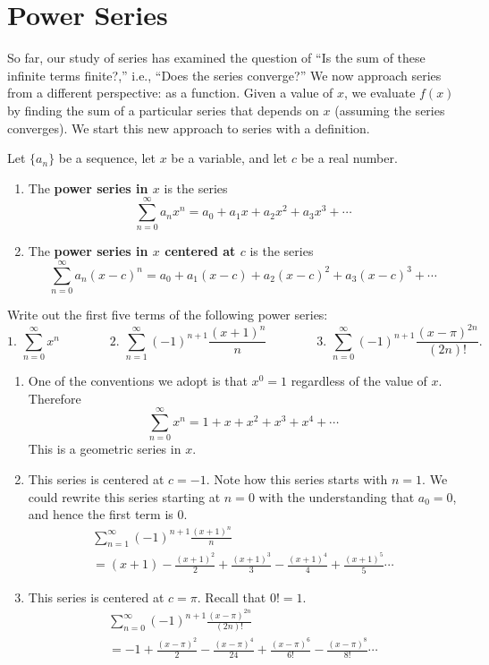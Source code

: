 \section{Power Series}\label{sec:power_series}

So far, our study of series has examined the question of ``Is the sum of these infinite terms finite?,'' i.e., ``Does the series converge?'' We now approach series from a different perspective: as a function. Given a value of $x$, we evaluate $f(x)$ by finding the sum of a particular series that depends on $x$ (assuming the series converges). We start this new approach to series with a definition.

\begin{definition}\label{def:power_series}
Let $\{a_n\}$ be a sequence, let $x$ be a variable, and let $c$ be a real number.
	\begin{enumerate}
		\item The \textbf{power series in $x$} is the series
		\[\sum_{n=0}^\infty a_nx^n = a_0+a_1x+a_2x^2+a_3x^3+\dotsb\]
		
		\item The \textbf{power series in $x$ centered at $c$} is the series
		\[\sum_{n=0}^\infty a_n(x-c)^n = a_0+a_1(x-c)+a_2(x-c)^2+a_3(x-c)^3+\dotsb\]
	\end{enumerate}
\end{definition}

\begin{example}\label{ex_ps1}
Write out the first five terms of the following power series:
\[
 \text{1. }\sum_{n=0}^\infty x^n \qquad\qquad
 \text{2. }\sum_{n=1}^\infty (-1)^{n+1}\frac{(x+1)^n}n\qquad\qquad
 \text{3. }\sum_{n=0}^\infty (-1)^{n+1} \frac{(x-\pi)^{2n}}{(2n)!}.
\]
\solution
\begin{enumerate}
	\item One of the conventions we adopt is that $x^0=1$ regardless of the value of $x$. Therefore
	\[\sum_{n=0}^\infty x^n = 1+x+x^2+x^3+x^4+\dotsb\]
	This is a geometric series in $x$.
	
	\item	This series is centered at $c=-1$. Note how this series starts with $n=1$. We could rewrite this series starting at $n=0$ with the understanding that $a_0=0$, and hence the first term is $0$.
	\begin{multline*}
	\sum_{n=1}^\infty (-1)^{n+1}\frac{(x+1)^n}n \\
	= (x+1) - \frac{(x+1)^2}{2} + \frac{(x+1)^3}{3} - \frac{(x+1)^4}{4}+\frac{(x+1)^5}{5}\dotsb
	\end{multline*}
	
	\item	This series is centered at $c=\pi$. Recall that $0!=1$.
	\begin{multline*}
	\sum_{n=0}^\infty (-1)^{n+1} \frac{(x-\pi)^{2n}}{(2n)!}\\
	= -1+\frac{(x-\pi)^2}{2} - \frac{(x-\pi)^4}{24}+ \frac{(x-\pi)^6}{6!}-\frac{(x-\pi)^8}{8!}\dotsb
	\end{multline*}
\end{enumerate}
\end{example}

